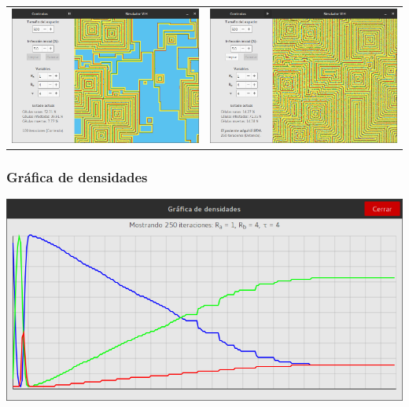 \documentclass[12pt,letterpaper,oneside]{report}
\begin{document}
	\begin{center}
		\begin{tabular}{c c}
		\includegraphics[width=8cm]{img/original/prueba/3.png} & \includegraphics[width=8cm]{img/original/prueba/4.png} \\
		\end{tabular}
	\end{center}

	\subsubsection{Gráfica de densidades}
	\begin{center}
		\includegraphics[width=14cm]{img/original/prueba/g.png}
	\end{center}
\end{document}
